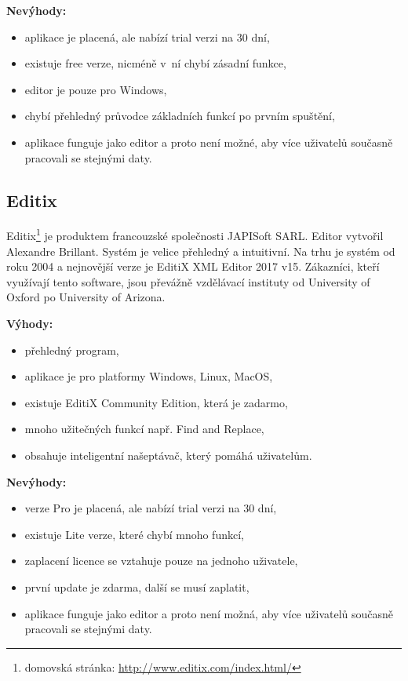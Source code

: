             \textbf{Nevýhody:}
                \begin{itemize}
                    \item aplikace je placená, ale nabízí trial verzi na 30 dní,
                    \item existuje free verze, nicméně v~ní chybí zásadní funkce,
                    \item editor je pouze pro Windows,
                    \item chybí přehledný průvodce základních funkcí po prvním spuštění,
                    \item aplikace funguje jako editor a proto není možné, aby více uživatelů současně pracovali se stejnými daty.                \end{itemize}
                
        \subsection{Editix} 
            Editix\footnote{domovská stránka: \url{http://www.editix.com/index.html/}} je produktem francouzské společnosti JAPISoft SARL. Editor vytvořil Alexandre Brillant. Systém je velice přehledný a intuitivní. Na trhu je systém od roku 2004 a nejnovější verze je EditiX XML Editor 2017 v15. Zákazníci, kteří využívají tento software, jsou převážně vzdělávací instituty od University of Oxford po University of Arizona.
            
            \textbf{Výhody:}
                \begin{itemize}
                    \item přehledný program,
                    \item aplikace je pro platformy Windows, Linux, MacOS,
                    \item existuje EditiX Community Edition, která je zadarmo,
                    \item mnoho užitečných funkcí např. Find and Replace,
                    \item obsahuje inteligentní našeptávač, který pomáhá uživatelům.
                \end{itemize}
                
            \textbf{Nevýhody:}
                \begin{itemize}
                    \item verze Pro je placená, ale nabízí trial verzi na 30 dní,
                    \item existuje Lite verze, které chybí mnoho funkcí,
                    \item zaplacení licence se vztahuje pouze na jednoho uživatele,
                    \item první update je zdarma, další se musí zaplatit,
                    \item aplikace funguje jako editor a proto není možná, aby více uživatelů současně pracovali se stejnými daty.   
                \end{itemize}
                
